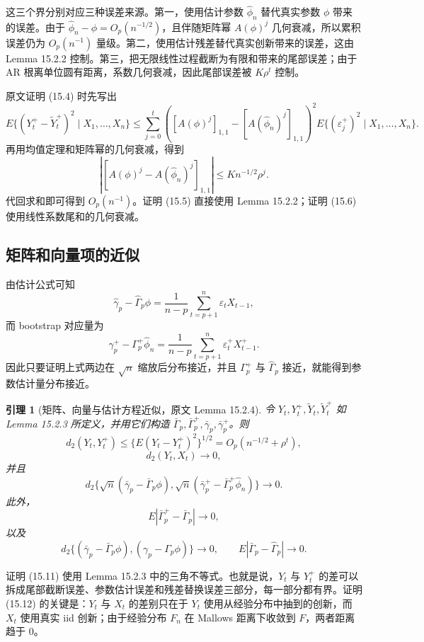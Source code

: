 \documentclass[11pt,a4paper]{ctexart}
\newtheorem{lemma}{引理}[section]
\begin{document}
这三个界分别对应三种误差来源。第一，使用估计参数 \(\hat\phi_n\) 替代真实参数 \(\phi\) 带来的误差。由于 \(\hat\phi_n-\phi=O_p(n^{-1/2})\)，且伴随矩阵幂 \(A(\phi)^j\) 几何衰减，所以累积误差仍为 \(O_p(n^{-1})\) 量级。第二，使用估计残差替代真实创新带来的误差，这由 Lemma 15.2.2 控制。第三，把无限线性过程截断为有限和带来的尾部误差；由于 AR 根离单位圆有距离，系数几何衰减，因此尾部误差被 \(K\rho^t\) 控制。

原文证明 (15.4) 时先写出
\[
  E\{(Y_t^+-\widetilde Y_t^+)^2\mid X_1,\ldots,X_n\}
  \le
  \sum_{j=0}^t
  \left([A(\phi)^j]_{1,1}-[A(\hat\phi_n)^j]_{1,1}\right)^2
  E\{(\varepsilon_j^+)^2\mid X_1,\ldots,X_n\}.
\]
再用均值定理和矩阵幂的几何衰减，得到
\[
  |[A(\phi)^j-A(\hat\phi_n)^j]_{1,1}|
  \le K n^{-1/2}\rho^j.
\]
代回求和即可得到 \(O_p(n^{-1})\)。证明 (15.5) 直接使用 Lemma 15.2.2；证明 (15.6) 使用线性系数尾和的几何衰减。

\subsection{矩阵和向量项的近似}

由估计公式可知
\[
  \hat\gamma_p-\hat\Gamma_p\phi
  =\frac1{n-p}\sum_{t=p+1}^n\varepsilon_tX_{t-1},
\]
而 bootstrap 对应量为
\[
  \gamma_p^+-\Gamma_p^+\hat\phi_n
  =\frac1{n-p}\sum_{t=p+1}^n\varepsilon_t^+X_{t-1}^+.
  \tag{15.10}
\]
因此只要证明上式两边在 \(\sqrt n\) 缩放后分布接近，并且 \(\Gamma_p^+\) 与 \(\hat\Gamma_p\) 接近，就能得到参数估计量分布接近。

\begin{lemma}[矩阵、向量与估计方程近似，原文 Lemma 15.2.4]
令 \(Y_t,Y_t^+,\widetilde Y_t,\widetilde Y_t^+\) 如 Lemma 15.2.3 所定义，并用它们构造 \(\bar\Gamma_p,\bar\Gamma_p^+,\bar\gamma_p,\bar\gamma_p^+\)。则
\[
  d_2(Y_t,Y_t^+)\le \{E(Y_t-Y_t^+)^2\}^{1/2}
  =O_p(n^{-1/2}+\rho^t),
  \tag{15.11}
\]
\[
  d_2(Y_t,X_t)\to0,
  \tag{15.12}
\]
并且
\[
  d_2\{\sqrt n(\bar\gamma_p-\bar\Gamma_p\phi),
        \sqrt n(\bar\gamma_p^+-\bar\Gamma_p^+\hat\phi_n)\}\to0.
  \tag{15.13}
\]
此外，
\[
  E|\bar\Gamma_p^+-\bar\Gamma_p|\to0,
  \tag{15.14}
\]
以及
\[
  d_2\{(\bar\gamma_p-\bar\Gamma_p\phi),
       (\gamma_p-\Gamma_p\phi)\}\to0,\qquad
  E|\bar\Gamma_p-\hat\Gamma_p|\to0.
  \tag{15.15}
\]
\end{lemma}

证明 (15.11) 使用 Lemma 15.2.3 中的三角不等式。也就是说，\(Y_t\) 与 \(Y_t^+\) 的差可以拆成尾部截断误差、参数估计误差和残差替换误差三部分，每一部分都有界。证明 (15.12) 的关键是：\(Y_t\) 与 \(X_t\) 的差别只在于 \(Y_t\) 使用从经验分布中抽到的创新，而 \(X_t\) 使用真实 iid 创新；由于经验分布 \(F_n\) 在 Mallows 距离下收敛到 \(F\)，两者距离趋于 0。
\end{document}
